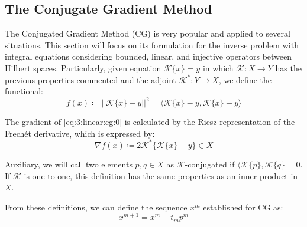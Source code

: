 		\subsection{The Conjugate Gradient Method}\label{chap:methods:linear:cg}
				
			The Conjugated Gradient Method (CG) is very popular and applied to several situations. This section will focus on its formulation for the inverse problem with integral equations considering bounded, linear, and injective operators between Hilbert spaces. Particularly, given equation $\mathcal{K}\{x\} = y$ in which $\mathcal{K} : X \rightarrow Y$ has the previous properties commented and the adjoint $\mathcal{K}^* : Y \rightarrow X$, we define the functional:
			\begin{equation}
				f(x) \coloneqq ||\mathcal{K}\{x\} - y||^2 = \langle \mathcal{K}\{x\} - y, \mathcal{K}\{x\} - y \rangle \label{eq:3:linear:cg:0}
			\end{equation}
		
			The gradient of \eqref{eq:3:linear:cg:0} is calculated by the Riesz representation of the Frechét derivative, which is expressed by:
			\begin{equation}
				\nabla f(x) \coloneqq 2\mathcal{K}^*\{\mathcal{K}\{x\}-y\} \in X \label{eq:3:linear:cg:1}
			\end{equation}
		
			Auxiliary, we will call two elements $p,q\in X$ as $\mathcal{K}$-conjugated if $\langle \mathcal{K}\{p\}, \mathcal{K}\{q\}=0$. If $\mathcal{K}$ is one-to-one, this definition has the same properties as an inner product in $X$.
			
			From these definitions, we can define the sequence $x^m$ established for CG as:
			\begin{equation}
				x^{m+1} = x^m - t_mp^m \label{eq:3:linear:cg:2}
			\end{equation}
		

